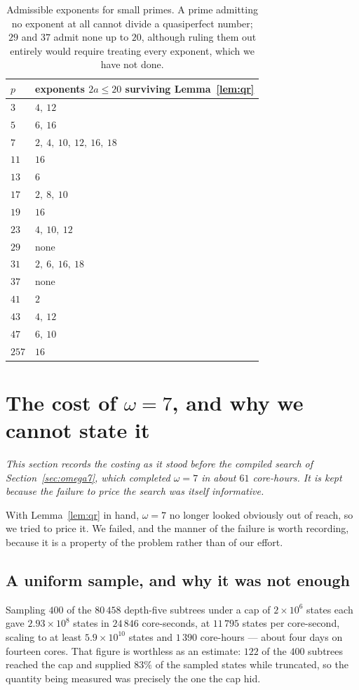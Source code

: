 \documentclass[11pt]{amsart}
\theoremstyle{remark}
\begin{document}
\begin{table}[h]
\centering
\begin{tabular}{ll}
\toprule
$p$ & exponents $2a \le 20$ surviving Lemma~\ref{lem:qr} \\
\midrule
$3$  & $4,\ 12$ \\
$5$  & $6,\ 16$ \\
$7$  & $2,\ 4,\ 10,\ 12,\ 16,\ 18$ \\
$11$ & $16$ \\
$13$ & $6$ \\
$17$ & $2,\ 8,\ 10$ \\
$19$ & $16$ \\
$23$ & $4,\ 10,\ 12$ \\
$29$ & none \\
$31$ & $2,\ 6,\ 16,\ 18$ \\
$37$ & none \\
$41$ & $2$ \\
$43$ & $4,\ 12$ \\
$47$ & $6,\ 10$ \\
$257$ & $16$ \\
\bottomrule
\end{tabular}
\caption{Admissible exponents for small primes. A prime admitting no exponent at
all cannot divide a quasiperfect number; $29$ and $37$ admit none up to $20$,
although ruling them out entirely would require treating every exponent, which
we have not done.}
\end{table}

\section{The cost of \texorpdfstring{$\omega = 7$}{omega = 7}, and why we cannot
state it}\label{sec:omega7cost}

\emph{This section records the costing as it stood before the compiled search of
Section~\ref{sec:omega7}, which completed $\omega = 7$ in about $61$ core-hours.
It is kept because the failure to price the search was itself informative.}

With Lemma~\ref{lem:qr} in hand, $\omega = 7$ no longer looked obviously out of
reach, so we tried to price it. We failed, and the manner of the failure is
worth recording, because it is a property of the problem rather than of our
effort.

\subsection{A uniform sample, and why it was not enough}
Sampling $400$ of the $80\,458$ depth-five subtrees under a cap of
$2 \times 10^{6}$ states each gave $2.93 \times 10^{8}$ states in $24\,846$
core-seconds, at $11\,795$ states per core-second, scaling to at least
$5.9 \times 10^{10}$ states and $1\,390$ core-hours --- about four days on
fourteen cores. That figure is worthless as an estimate: $122$ of the $400$
subtrees reached the cap and supplied $83\%$ of the sampled states while
truncated, so the quantity being measured was precisely the one the cap hid.
\end{document}
